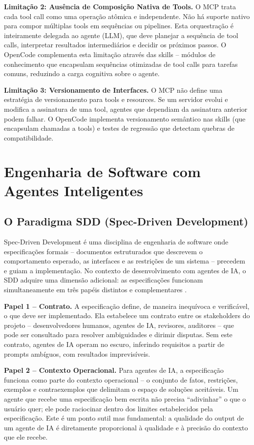 \documentclass[12pt,a4paper,sumario=tradicional,openany]{abntex2}
\begin{document}
\textbf{Limitação 2: Ausência de Composição Nativa de Tools.} O MCP trata cada tool call como uma operação atômica e independente. Não há suporte nativo para compor múltiplas tools em sequências ou pipelines. Esta orquestração é inteiramente delegada ao agente (LLM), que deve planejar a sequência de tool calls, interpretar resultados intermediários e decidir os próximos passos. O OpenCode complementa esta limitação através das skills -- módulos de conhecimento que encapsulam sequências otimizadas de tool calls para tarefas comuns, reduzindo a carga cognitiva sobre o agente.

\textbf{Limitação 3: Versionamento de Interfaces.} O MCP não define uma estratégia de versionamento para tools e resources. Se um servidor evolui e modifica a assinatura de uma tool, agentes que dependiam da assinatura anterior podem falhar. O OpenCode implementa versionamento semântico nas skills (que encapsulam chamadas a tools) e testes de regressão que detectam quebras de compatibilidade.

\section{Engenharia de Software com Agentes Inteligentes}

\subsection{O Paradigma SDD (Spec-Driven Development)}

Spec-Driven Development é uma disciplina de engenharia de software onde especificações formais -- documentos estruturados que descrevem o comportamento esperado, as interfaces e as restrições de um sistema -- precedem e guiam a implementação. No contexto de desenvolvimento com agentes de IA, o SDD adquire uma dimensão adicional: as especificações funcionam simultaneamente em três papéis distintos e complementares \cite{gomes2025sdscai, garfinkel2026acm}.

\textbf{Papel 1 -- Contrato.} A especificação define, de maneira inequívoca e verificável, o que deve ser implementado. Ela estabelece um contrato entre os stakeholders do projeto -- desenvolvedores humanos, agentes de IA, revisores, auditores -- que pode ser consultado para resolver ambiguidades e dirimir disputas. Sem este contrato, agentes de IA operam no escuro, inferindo requisitos a partir de prompts ambíguos, com resultados imprevisíveis.

\textbf{Papel 2 -- Contexto Operacional.} Para agentes de IA, a especificação funciona como parte do contexto operacional -- o conjunto de fatos, restrições, exemplos e contraexemplos que delimitam o espaço de soluções aceitáveis. Um agente que recebe uma especificação bem escrita não precisa ``adivinhar'' o que o usuário quer; ele pode raciocinar dentro dos limites estabelecidos pela especificação. Este é um ponto sutil mas fundamental: a qualidade do output de um agente de IA é diretamente proporcional à qualidade e à precisão do contexto que ele recebe.
\end{document}
